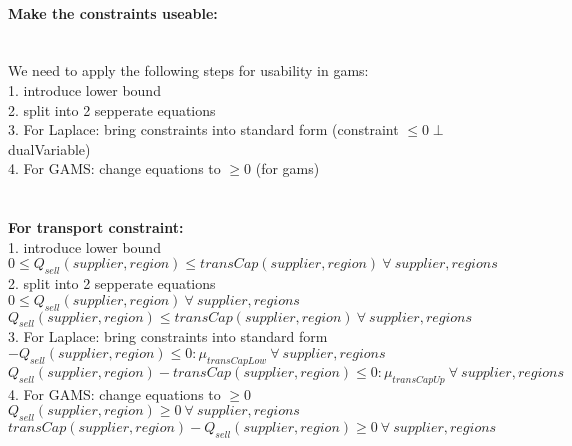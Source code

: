 \documentclass{article}
\begin{document}
\paragraph*{Make the constraints useable:}
\hfill\\
We need to apply the following steps for usability in gams:\\
1. introduce lower bound\\
2. split into 2 sepperate equations\\
3. For Laplace: bring constraints into standard form (constraint $\leq 0 \perp $ dualVariable)\\
4. For GAMS: change equations to $\geq 0$ (for gams)\\
\hfil\\
\hfill\\
\textbf{For	transport constraint: }\\
1. introduce lower bound\\
\quad$0 \leq Q_{sell}(supplier, region) \leq transCap(supplier, region)\: \forall \: supplier,regions$\\
2. split into 2 sepperate equations\\
\quad$0 \leq Q_{sell}(supplier, region)\: \forall \: supplier,regions$\\
\quad$Q_{sell}(supplier, region) \leq transCap(supplier, region)\: \forall \: supplier,regions$\\
3. For Laplace: bring constraints into standard form\\
\quad$- Q_{sell}(supplier, region) \leq 0 : \mu_{transCapLow}\: \forall \: supplier,regions$\\
\quad$Q_{sell}(supplier, region) - transCap(supplier, region) \leq 0  : \mu_{transCapUp}\: \forall \: supplier,regions$\\
4. For GAMS: change equations to $\geq 0$\\
\quad$ Q_{sell}(supplier, region) \geq 0 \: \forall \: supplier,regions$\\
\quad$transCap(supplier, region) - Q_{sell}(supplier, region) \geq 0 \: \forall \: supplier,regions$\\
\end{document}
